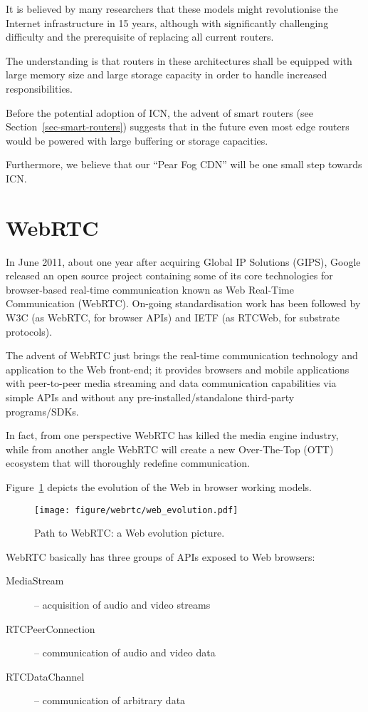	It is believed by many researchers that these models might revolutionise the Internet infrastructure in 15 years, although with significantly challenging difficulty and the prerequisite of replacing all current routers. 
	
	The understanding is that routers in these architectures shall be equipped with large memory size and large storage capacity in order to handle increased responsibilities. 
	
	Before the potential adoption of ICN, the advent of smart routers (see Section~\ref{sec-smart-routers}) suggests that in the future even most edge routers would be powered with large buffering or storage capacities. 
	
    Furthermore, we believe that our ``Pear Fog CDN'' will be one small step towards ICN. 

\section{WebRTC} %
In June 2011, about one year after acquiring Global IP Solutions (GIPS), Google released an open source project containing some of its core technologies for browser-based real-time communication known as Web Real-Time Communication (WebRTC). On-going standardisation work has been followed by W3C (as WebRTC, for browser APIs) and IETF (as RTCWeb, for substrate protocols). 

The advent of WebRTC just brings the real-time communication technology and application to the Web front-end; it provides browsers and mobile applications with peer-to-peer media streaming and data communication capabilities via simple APIs and without any pre-installed/standalone third-party programs/SDKs. 

In fact, from one perspective WebRTC has killed the media engine industry, while from another angle WebRTC will create a new Over-The-Top (OTT) ecosystem that will thoroughly redefine communication. 

Figure~\ref{fig:web-evolution} depicts the evolution of the Web in browser working models. 
\begin{figure}[ht]
	\centering
	\texttt{[image: figure/webrtc/web\_evolution.pdf]}
	\caption{Path to WebRTC: a Web evolution picture.}\label{fig:web-evolution}
\end{figure}

WebRTC basically has three groups of APIs exposed to Web browsers: 
\begin{description}
	\item[MediaStream] 
	-- acquisition of audio and video streams
	\item[RTCPeerConnection] 
	-- communication of audio and video data
	\item[RTCDataChannel] 
	-- communication of arbitrary data
\end{description}

